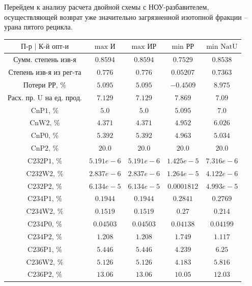 Перейдем к анализу расчета двойной схемы с НОУ-разбавителем, осуществляющей возврат уже значительно загрязненной изотопной фракции -- урана пятого рецикла.

\begin{table}
    \begin{tabular}{ccccc}
        $\text{П-р | К-й опт-и}$ & $\text{max И}$ & $\text{max ИР}$ & $\text{min РР}$ & $\text{min NatU}$\\ \hline
        $\text{Сумм. степень изв-я}$ & $0.8594$ & $0.8594$ & $0.7529$ & $0.8538$\\ \hline
        $\text{Степень изв-я из рег-та}$ & $0.776$ & $0.776$ & $0.05207$ & $0.7363$\\ \hline
        $\text{Потери РР, \%}$ & $5.095$ & $5.095$ & $-0.4509$ & $8.975$\\ \hline
        $\text{Расх. пр. U на ед. прод.}$ & $7.129$ & $7.129$ & $7.869$ & $7.09$\\ \hline
        $\text{CnP1, \%}$ & $5.0$ & $5.0$ & $5.095$ & $7.0$\\ \hline
        $\text{CnW2, \%}$ & $4.371$ & $4.371$ & $4.952$ & $6.026$\\ \hline
        $\text{CnP0, \%}$ & $5.392$ & $5.392$ & $4.963$ & $5.034$\\ \hline
        $\text{CnP2, \%}$ & $20.0$ & $20.0$ & $20.0$ & $20.0$\\ \hline
        $\text{C232P1, \%}$ & $5.191e-6$ & $5.191e-6$ & $1.425e-5$ & $7.316e-6$\\ \hline
        $\text{C232W2, \%}$ & $2.837e-6$ & $2.837e-6$ & $1.264e-5$ & $4.122e-6$\\ \hline
        $\text{C232P2, \%}$ & $6.134e-5$ & $6.134e-5$ & $0.0001812$ & $4.993e-5$\\ \hline
        $\text{C234P1, \%}$ & $0.1944$ & $0.1944$ & $0.2841$ & $0.2769$\\ \hline
        $\text{C234W2, \%}$ & $0.1519$ & $0.1519$ & $0.27$ & $0.214$\\ \hline
        $\text{C234P0, \%}$ & $0.04503$ & $0.04503$ & $0.04138$ & $0.04199$\\ \hline
        $\text{C234P2, \%}$ & $1.208$ & $1.208$ & $1.749$ & $1.117$\\ \hline
        $\text{C236P1, \%}$ & $5.446$ & $5.446$ & $4.239$ & $6.25$\\ \hline
        $\text{C236W2, \%}$ & $5.126$ & $5.126$ & $4.183$ & $5.816$\\ \hline
        $\text{C236P2, \%}$ & $13.06$ & $13.06$ & $10.05$ & $12.03$\\ \hline

\end{tabular}
\end{table}
